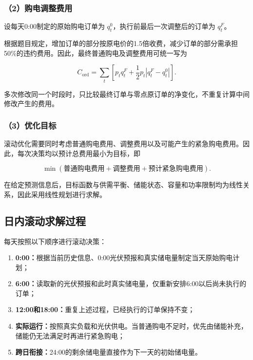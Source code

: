 \subsubsection*{（2）购电调整费用}

设每天0:00制定的原始购电订单为 $q_t^0$，执行前最后一次调整后的订单为 $q_t^F$。

根据题目规定，增加订单的部分按原电价的1.5倍收费，减少订单的部分需承担50\%的违约费用。因此，最终普通购电及调整费用可统一写为

\begin{equation}
C_{\mathrm{ord}}
=
\sum_t
\left[
p_t q_t^F
+
\frac{1}{2}p_t
\left|
q_t^F-q_t^0
\right|
\right].
\end{equation}

多次修改同一个时段时，只比较最终订单与零点原订单的净变化，不重复计算中间修改产生的费用。

\subsubsection*{（3）优化目标}

滚动优化需要同时考虑普通购电费用、调整费用以及可能产生的紧急购电费用。因此，每次决策均以预计总费用最小为目标，即

\[
\min
\left(
\text{普通购电费用}
+
\text{调整费用}
+
\text{预计紧急购电费用}
\right).
\]

在给定预测信息后，目标函数与供需平衡、储能状态、容量和功率限制均为线性关系，因此采用线性规划进行求解。


\subsection{日内滚动求解过程}

每天按照以下顺序进行滚动决策：

\begin{enumerate}
    \item \textbf{0:00：}根据当前历史信息、0:00光伏预报和真实储电量制定当天原始购电计划；
    \item \textbf{6:00：}读取新的光伏预报和此时真实储电量，仅重新安排6:00以后尚未执行的订单；
    \item \textbf{12:00和18:00：}重复上述过程，已经执行的订单保持不变；
    \item \textbf{实际运行：}按照真实负载和光伏供电。当普通购电不足时，优先由储能补充，储能仍无法满足时再进行紧急购电；
    \item \textbf{跨日衔接：}24:00的剩余储电量直接作为下一天的初始储电量。
\end{enumerate}

